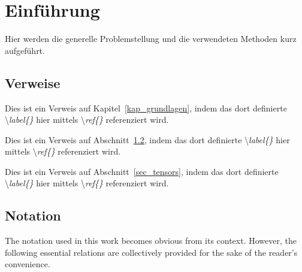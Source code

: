 
\thispagestyle{empty} %

\chapter{Einführung}
\thispagestyle{fancy}


\label{kap_einfuehrung}


Hier werden die generelle Problemstellung und die verwendeten Methoden kurz aufgeführt.


\section{Verweise}

Dies ist ein Verweis auf Kapitel~\ref{kap_grundlagen}, indem das dort definierte \textbackslash\emph{label\{\}} hier mittels \textbackslash\emph{ref\{\}} referenziert wird.

Dies ist ein Verweis auf Abschnitt~\ref{sec_notation}, indem das dort definierte \textbackslash\emph{label\{\}} hier mittels \textbackslash\emph{ref\{\}} referenziert wird.

Dies ist ein Verweis auf Abschnitt~\ref{sec_tensors}, indem das dort definierte \textbackslash\emph{label\{\}} hier mittels \textbackslash\emph{ref\{\}} referenziert wird.


\newpage 

\section{Notation}
\label{sec_notation}

The notation used in this work becomes obvious from its context. However, the following essential relations are collectively provided for the sake of the reader's convenience.

